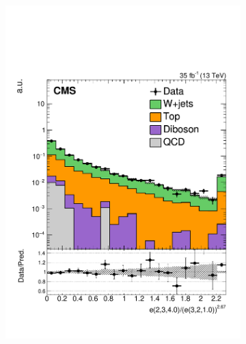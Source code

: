 \begin{figure}[]
    \begin{center}
        \begin{subfigure}[t]{0.32\textwidth}
            \includegraphics[width=\textwidth]{figures/toptagging/datamc/singlemuonw_ratio_23403210_logy.pdf}
        \end{subfigure}
        \begin{subfigure}[t]{0.32\textwidth}

\end{subfigure}
\end{center}
\end{figure}
